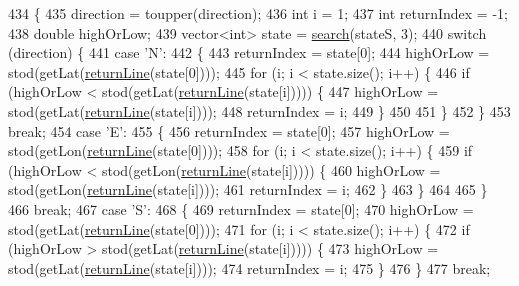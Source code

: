 \begin{DoxyCode}
434                                                             \{
435     direction = toupper(direction);
436     \textcolor{keywordtype}{int} i = 1;
437     \textcolor{keywordtype}{int} returnIndex = -1;
438     \textcolor{keywordtype}{double} highOrLow;
439     vector<int> state = \hyperlink{classSSClass_a9df3598c000a6a5e9ef994d19196e69f}{search}(stateS, 3);
440     \textcolor{keywordflow}{switch} (direction) \{
441     \textcolor{keywordflow}{case} \textcolor{charliteral}{'N'}:
442     \{
443         returnIndex = state[0];
444         highOrLow = stod(getLat(\hyperlink{classSSClass_ab0a8ea1af895df28359b5733bd920ef3}{returnLine}(state[0])));
445         \textcolor{keywordflow}{for} (i; i < state.size(); i++) \{
446             \textcolor{keywordflow}{if} (highOrLow < stod(getLat(\hyperlink{classSSClass_ab0a8ea1af895df28359b5733bd920ef3}{returnLine}(state[i])))) \{
447                 highOrLow = stod(getLat(\hyperlink{classSSClass_ab0a8ea1af895df28359b5733bd920ef3}{returnLine}(state[i])));
448                 returnIndex = i;
449             \}
450 
451         \}
452     \}
453     \textcolor{keywordflow}{break};
454     \textcolor{keywordflow}{case} \textcolor{charliteral}{'E'}:
455     \{
456         returnIndex = state[0];
457         highOrLow = stod(getLon(\hyperlink{classSSClass_ab0a8ea1af895df28359b5733bd920ef3}{returnLine}(state[0])));
458         \textcolor{keywordflow}{for} (i; i < state.size(); i++) \{
459             \textcolor{keywordflow}{if} (highOrLow < stod(getLon(\hyperlink{classSSClass_ab0a8ea1af895df28359b5733bd920ef3}{returnLine}(state[i])))) \{
460                 highOrLow = stod(getLon(\hyperlink{classSSClass_ab0a8ea1af895df28359b5733bd920ef3}{returnLine}(state[i])));
461                 returnIndex = i;
462             \}
463         \}
464         
465     \}
466     \textcolor{keywordflow}{break};
467     \textcolor{keywordflow}{case} \textcolor{charliteral}{'S'}:
468     \{
469         returnIndex = state[0];
470         highOrLow = stod(getLat(\hyperlink{classSSClass_ab0a8ea1af895df28359b5733bd920ef3}{returnLine}(state[0])));
471         \textcolor{keywordflow}{for} (i; i < state.size(); i++) \{
472             \textcolor{keywordflow}{if} (highOrLow > stod(getLat(\hyperlink{classSSClass_ab0a8ea1af895df28359b5733bd920ef3}{returnLine}(state[i])))) \{
473                 highOrLow = stod(getLat(\hyperlink{classSSClass_ab0a8ea1af895df28359b5733bd920ef3}{returnLine}(state[i])));
474                 returnIndex = i;
475             \}
476         \}
477         \textcolor{keywordflow}{break};

\end{DoxyCode}
